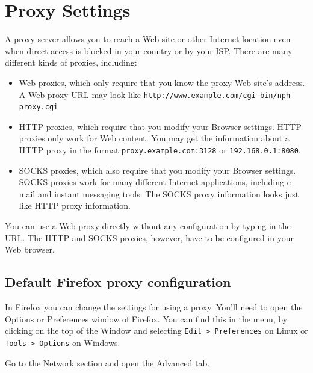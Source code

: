 \section{Proxy Settings}

A proxy server allows you to reach a Web site or other Internet location
even when direct access is blocked in your country or by your ISP. There
are many different kinds of proxies, including:

\begin{itemize}
\item
  Web proxies, which only require that you know the proxy Web site's
  address. A Web proxy URL may look like
  \verb!http://www.example.com/cgi-bin/nph-proxy.cgi!
\item
  HTTP proxies, which require that you modify your Browser settings.
  HTTP proxies only work for Web content. You may get the information
  about a HTTP proxy in the format \verb!proxy.example.com:3128! or
  \verb!192.168.0.1:8080!.
\item
  SOCKS proxies, which also require that you modify your Browser
  settings. SOCKS proxies work for many different Internet applications,
  including e-mail and instant messaging tools. The SOCKS proxy
  information looks just like HTTP proxy information.
\end{itemize}
You can use a Web proxy directly without any configuration by typing in
the URL. The HTTP and SOCKS proxies, however, have to be configured in
your Web browser.

\subsection{Default Firefox proxy configuration}

In Firefox you can change the settings for using a proxy. You'll need to
open the Options or Preferences window of Firefox. You can find this in
the menu, by clicking on the top of the Window and selecting
\verb!Edit > Preferences! on Linux or \verb!Tools > Options! on Windows.

Go to the Network section and open the Advanced tab.

